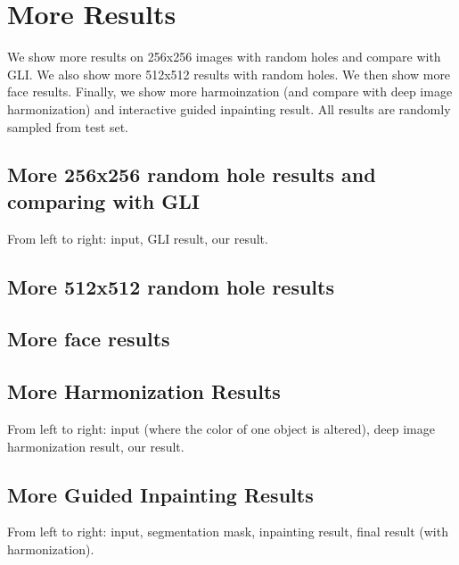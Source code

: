 
\section{More Results}

We show more results on 256x256 images with random holes and compare with GLI. We also show more 512x512 results with random holes. We then show more face results. Finally, we show more harmoinzation (and compare with deep image harmonization) and interactive guided inpainting result. All results are randomly sampled from test set.

\subsection{More 256x256 random hole results and comparing with GLI}
From left to right: input, GLI result, our result.


\subsection{More 512x512 random hole results}


\subsection{More face results}


\subsection{More Harmonization Results}
From left to right: input (where the color of one object is altered), deep image harmonization result, our result.


\subsection{More Guided Inpainting Results}
From left to right: input, segmentation mask, inpainting result, final result (with harmonization).


